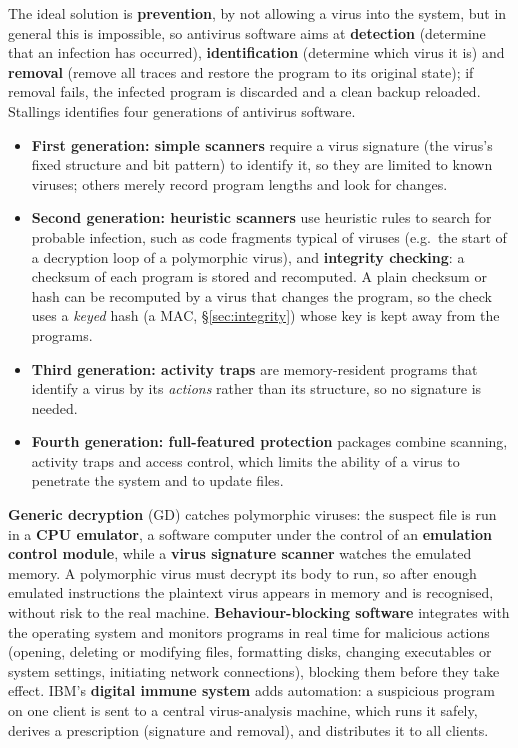 The ideal solution is \textbf{prevention}, by not allowing a virus into the system, but in general this is impossible, so antivirus software aims at \textbf{detection} (determine that an infection has occurred), \textbf{identification} (determine which virus it is) and \textbf{removal} (remove all traces and restore the program to its original state); if removal fails, the infected program is discarded and a clean backup reloaded. Stallings identifies four generations of antivirus software.
\begin{itemize}
  \item \textbf{First generation: simple scanners} require a virus signature (the virus's fixed structure and bit pattern) to identify it, so they are limited to known viruses; others merely record program lengths and look for changes.
  \item \textbf{Second generation: heuristic scanners} use heuristic rules to search for probable infection, such as code fragments typical of viruses (e.g.\ the start of a decryption loop of a polymorphic virus), and \textbf{integrity checking}: a checksum of each program is stored and recomputed. A plain checksum or hash can be recomputed by a virus that changes the program, so the check uses a \emph{keyed} hash (a MAC, \S\ref{sec:integrity}) whose key is kept away from the programs.
  \item \textbf{Third generation: activity traps} are memory-resident programs that identify a virus by its \emph{actions} rather than its structure, so no signature is needed.
  \item \textbf{Fourth generation: full-featured protection} packages combine scanning, activity traps and access control, which limits the ability of a virus to penetrate the system and to update files.
\end{itemize}
\textbf{Generic decryption} (GD) catches polymorphic viruses: the suspect file is run in a \textbf{CPU emulator}, a software computer under the control of an \textbf{emulation control module}, while a \textbf{virus signature scanner} watches the emulated memory. A polymorphic virus must decrypt its body to run, so after enough emulated instructions the plaintext virus appears in memory and is recognised, without risk to the real machine. \textbf{Behaviour-blocking software} integrates with the operating system and monitors programs in real time for malicious actions (opening, deleting or modifying files, formatting disks, changing executables or system settings, initiating network connections), blocking them before they take effect. IBM's \textbf{digital immune system} adds automation: a suspicious program on one client is sent to a central virus-analysis machine, which runs it safely, derives a prescription (signature and removal), and distributes it to all clients.

